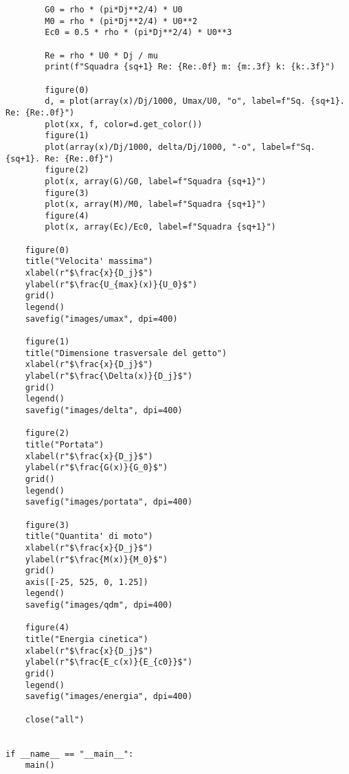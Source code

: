 \begin{lstlisting}
        G0 = rho * (pi*Dj**2/4) * U0
        M0 = rho * (pi*Dj**2/4) * U0**2
        Ec0 = 0.5 * rho * (pi*Dj**2/4) * U0**3
        
        Re = rho * U0 * Dj / mu
        print(f"Squadra {sq+1} Re: {Re:.0f} m: {m:.3f} k: {k:.3f}")

        figure(0)
        d, = plot(array(x)/Dj/1000, Umax/U0, "o", label=f"Sq. {sq+1}. Re: {Re:.0f}")
        plot(xx, f, color=d.get_color())
        figure(1)
        plot(array(x)/Dj/1000, delta/Dj/1000, "-o", label=f"Sq. {sq+1}. Re: {Re:.0f}")
        figure(2)
        plot(x, array(G)/G0, label=f"Squadra {sq+1}")
        figure(3)
        plot(x, array(M)/M0, label=f"Squadra {sq+1}")
        figure(4)
        plot(x, array(Ec)/Ec0, label=f"Squadra {sq+1}")

    figure(0)
    title("Velocita' massima")
    xlabel(r"$\frac{x}{D_j}$")
    ylabel(r"$\frac{U_{max}(x)}{U_0}$")
    grid()
    legend()
    savefig("images/umax", dpi=400)

    figure(1)
    title("Dimensione trasversale del getto")
    xlabel(r"$\frac{x}{D_j}$")
    ylabel(r"$\frac{\Delta(x)}{D_j}$")
    grid()
    legend()
    savefig("images/delta", dpi=400)

    figure(2)
    title("Portata")
    xlabel(r"$\frac{x}{D_j}$")
    ylabel(r"$\frac{G(x)}{G_0}$")
    grid()
    legend()
    savefig("images/portata", dpi=400)

    figure(3)
    title("Quantita' di moto")
    xlabel(r"$\frac{x}{D_j}$")
    ylabel(r"$\frac{M(x)}{M_0}$")
    grid()
    axis([-25, 525, 0, 1.25])
    legend()
    savefig("images/qdm", dpi=400)

    figure(4)
    title("Energia cinetica")
    xlabel(r"$\frac{x}{D_j}$")
    ylabel(r"$\frac{E_c(x)}{E_{c0}}$")
    grid()
    legend()
    savefig("images/energia", dpi=400)

    close("all")


if __name__ == "__main__":
    main()
\end{lstlisting}

